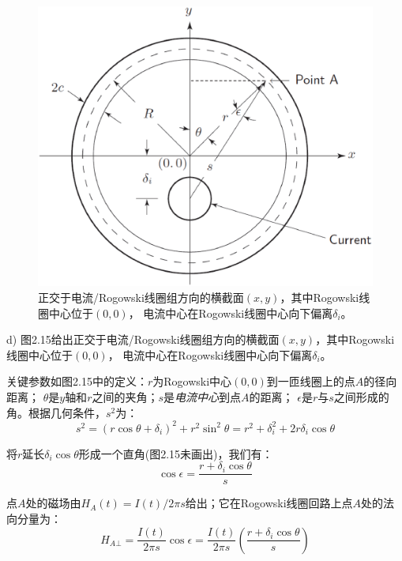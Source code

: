 \begin{figure}[htbp]
	\centering
	\includegraphics[scale=0.4]{chpt2/figs/fig2.15.eps}
	\caption{正交于电流/Rogowski线圈组方向的横截面$(x,y)$，其中Rogowski线圈中心位于$(0,0)$，
电流中心在Rogowski线圈中心向下偏离$\delta_i$。}
\end{figure}

d) 图2.15给出正交于电流/Rogowski线圈组方向的横截面$(x,y)$，其中Rogowski线圈中心位于$(0,0)$，
电流中心在Rogowski线圈中心向下偏离$\delta_i$。

关键参数如图2.15中的定义：$r$为Rogowski中心$(0,0)$到一匝线圈上的点$A$的径向距离；
$\theta$是$y$轴和$r$之间的夹角；$s$是\textit{电流中心}到点$A$的距离；
$\epsilon$是$r$与$s$之间形成的角。根据几何条件，$s^2$为：
\begin{equation*}
s^2=(r\cos\theta+\delta_i)^2+r^2\sin^2\theta=r^2+\delta_i^2+2r\delta_i\cos\theta \tag{S9.7}
\end{equation*}

将$r$延长$\delta_i \cos\theta$形成一个直角(图2.15未画出)，我们有：
\begin{equation*}
\cos\epsilon=\frac{r+\delta_i \cos\theta}{s} \tag{S9.8}
\end{equation*}

点$A$处的磁场由$H_A(t)=I(t)/2\pi s$给出；它在Rogowski线圈回路上点$A$处的法向分量为：
\begin{equation*}
H_{A\bot}=\frac{I(t)}{2\pi s}\cos\epsilon=\frac{I(t)}{2\pi s}\left(\frac{r+\delta_i \cos\theta}{s}\right) \tag{S9.9}
\end{equation*}

